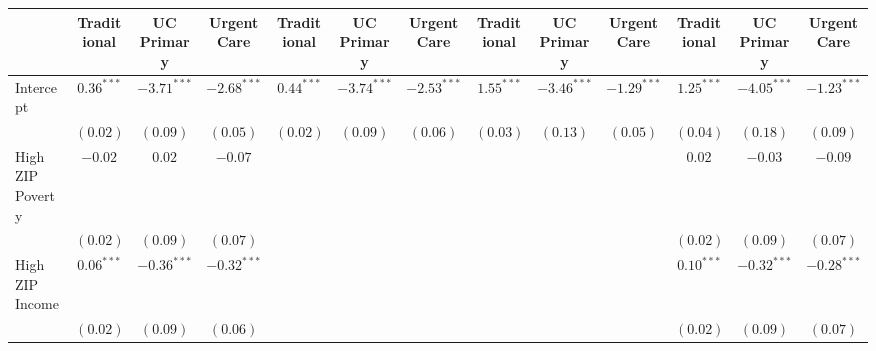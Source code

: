 \documentclass[12pt,twoside]{reedthesis}
\begin{document}
  \begin{table}
  \begin{center}
  \begin{tiny}
  \begin{tabular}{l@{} c@{} c@{} c@{} c@{} c@{} c@{} c@{} c@{} c@{} c@{} c@{} c@{} }
  \toprule
   & Traditional & UC Primary & Urgent Care & Traditional & UC Primary & Urgent Care & Traditional & UC Primary & Urgent Care & Traditional & UC Primary & Urgent Care \\
  \midrule
  Intercept          & $\mathbf{0.36}^{***}$ & $\mathbf{-3.71}^{***}$ & $\mathbf{-2.68}^{***}$ & $\mathbf{0.44}^{***}$  & $\mathbf{-3.74}^{***}$ & $\mathbf{-2.53}^{***}$ & $\mathbf{1.55}^{***}$  & $\mathbf{-3.46}^{***}$ & $\mathbf{-1.29}^{***}$ & $\mathbf{1.25}^{***}$  & $\mathbf{-4.05}^{***}$ & $\mathbf{-1.23}^{***}$ \\
                     & $(0.02)$              & $(0.09)$               & $(0.05)$               & $(0.02)$               & $(0.09)$               & $(0.06)$               & $(0.03)$               & $(0.13)$               & $(0.05)$               & $(0.04)$               & $(0.18)$               & $(0.09)$               \\
  High ZIP Poverty   & $-0.02$               & $0.02$                 & $-0.07$                &                        &                        &                        &                        &                        &                        & $0.02$                 & $-0.03$                & $-0.09$                \\
                     & $(0.02)$              & $(0.09)$               & $(0.07)$               &                        &                        &                        &                        &                        &                        & $(0.02)$               & $(0.09)$               & $(0.07)$               \\
  High ZIP Income    & $\mathbf{0.06}^{***}$ & $\mathbf{-0.36}^{***}$ & $\mathbf{-0.32}^{***}$ &                        &                        &                        &                        &                        &                        & $\mathbf{0.10}^{***}$  & $\mathbf{-0.32}^{***}$ & $\mathbf{-0.28}^{***}$ \\
                     & $(0.02)$              & $(0.09)$               & $(0.06)$               &                        &                        &                        &                        &                        &                        & $(0.02)$               & $(0.09)$               & $(0.07)$               \\

\end{tabular}
\end{tiny}
\end{center}
\end{table}
\end{document}

